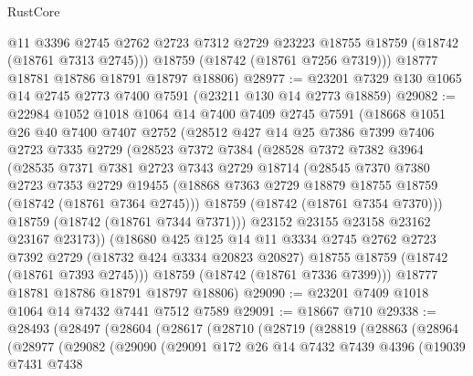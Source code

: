 \begin{lexlean}{RustCore}
\begin{coremodule}
          @11
          @3396
          @2745
          @2762
          @2723
          @7312
          @2729
          @23223
          @18755
          @18759
          (@18742 (@18761 @7313 @2745)))
        @18759
        (@18742 (@18761 @7256 @7319)))
      @18777
      @18781
      @18786
      @18791
      @18797
      @18806)
@28977 := @23201 @7329 @130 @1065 @14 @2745 @2773 @7400 @7591 (@23211 @130 @14 @2773 @18859)
@29082 := @22984
    @1052
    @1018
    @1064
    @14
    @7400
    @7409
    @2745
    @7591
    (@18668
      @1051
      @26
      @40
      @7400
      @7407
      @2752
      (@28512
        @427
        @14
        @25
        @7386
        @7399
        @7406
        @2723
        @7335
        @2729
        (@28523
          @7372
          @7384
          (@28528
            @7372
            @7382
            @3964
            (@28535
              @7371
              @7381
              @2723
              @7343
              @2729
              @18714
              (@28545
                @7370
                @7380
                @2723
                @7353
                @2729
                @19455
                (@18868 @7363 @2729 @18879 @18755 @18759 (@18742 (@18761 @7364 @2745)))
                @18759
                (@18742 (@18761 @7354 @7370)))
              @18759
              (@18742 (@18761 @7344 @7371)))
            @23152
            @23155
            @23158
            @23162
            @23167
            @23173))
        (@18680
          @425
          @125
          @14
          @11
          @3334
          @2745
          @2762
          @2723
          @7392
          @2729
          (@18732 @424 @3334 @20823 @20827)
          @18755
          @18759
          (@18742 (@18761 @7393 @2745)))
        @18759
        (@18742 (@18761 @7336 @7399)))
      @18777
      @18781
      @18786
      @18791
      @18797
      @18806)
@29090 := @23201 @7409 @1018 @1064 @14 @7432 @7441 @7512 @7589
@29091 := @18667 @710
@29338 := @28493
    (@28497
      (@28604
        (@28617
          (@28710
            (@28719
              (@28819
                (@28863
                  (@28964
                    (@28977
                      (@29082
                        (@29090
                          (@29091
                            @172
                            @26
                            @14
                            @7432
                            @7439
                            @4396
                            (@19039
                              @7431
                              @7438

\end{coremodule}
\end{lexlean}
